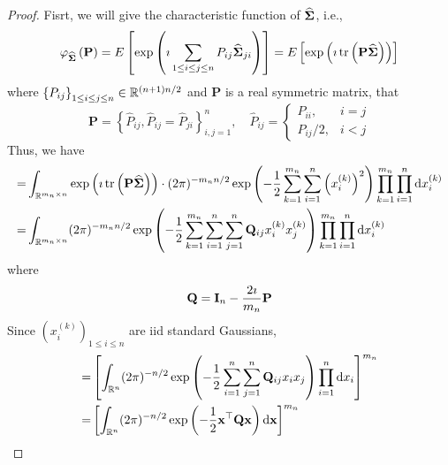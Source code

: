 \begin{proof}
	Fisrt, we will give the characteristic function of \(\widehat{\boldsymbol{\Sigma}}\), i.e.,
	\begin{equation*}
		\varphi_{\widehat{\boldsymbol{\Sigma}}}\left(\mathbf{P}\right)=E\left[\exp\left(\imath\sum_{1\leq i\leq j\leq n}P_{ij}\widehat{\boldsymbol{\Sigma}}_{ji}\right)\right]=E\left[\exp\left(\imath\operatorname{tr}\left(\mathbf{P}\widehat{\boldsymbol{\Sigma}}\right)\right)\right]
	\end{equation*}
	where \(\left\{P_{ij}\right\}_{1\leq i\leq j\leq n}\in\mathbb{R}^{(n+1)n/2}\) and \(\mathbf{P}\) is a real symmetric matrix, that
	\begin{equation*}
		\mathbf{P}=\left\{\widehat{P}_{ij},\widehat{P}_{ij}=\widehat{P}_{ji}\right\}_{i,j=1}^{n},\quad\widehat{P}_{ij}=\begin{cases}P_{ii}, & i=j \\ P_{ij} / 2, & i<j \end{cases}
	\end{equation*}
	Thus, we have
	\begin{equation*}
		\begin{aligned}
			= & \int_{\mathbb{R}^{m_{n}\times n}}\exp\left(\imath\operatorname{tr}\left(\mathbf{P}\widehat{\boldsymbol{\Sigma}}\right)\right)\cdot(2\pi)^{-m_{n}n/2}\exp\left(-\frac{1}{2}\sum_{k=1}^{m_{n}}\sum_{i=1}^{n}\left(x_{i}^{(k)}\right)^{2}\right)\prod_{k=1}^{m_{n}}\prod_{i=1}^{n}\mathop{}\!\mathrm{d} x_{i}^{(k)} \\
			= & \int_{\mathbb{R}^{m_{n}\times n}}(2\pi)^{-m_{n}n/2}\exp\left(-\frac{1}{2}\sum_{k=1}^{m_{n}}\sum_{i=1}^{n}\sum_{j=1}^{n}\mathbf{Q}_{ij}x_{i}^{(k)}x_{j}^{(k)}\right)\prod_{k=1}^{m_{n}}\prod_{i=1}^{n}\mathop{}\!\mathrm{d} x_{i}^{(k)}
		\end{aligned}
	\end{equation*}
	where
	\begin{equation*}
		\mathbf{Q}=\mathbf{I}_{n}-\frac{2\imath}{m_{n}}\mathbf{P}
	\end{equation*}
	Since \(\left(x_{i}^{(k)}\right)_{1\leq i\leq n}\) are iid standard Gaussians,
	\begin{equation*}
		\begin{aligned}
			= & \left[\int_{\bbR^{n}}(2\pi)^{-n/2}\exp\left(-\frac{1}{2}\sum_{i=1}^{n}\sum_{j=1}^{n}\bfQ_{ij}x_{i}x_{j}\right)\prod_{i=1}^{n}\dif x_{i}\right]^{m_{n}}                                                                      \\
			= & \left[\int_{\bbR^{n}}(2\pi)^{-n/2}\exp\left(-\frac{1}{2}\bfx^{\top}\bfQ\bfx\right)\dif\bfx\right]^{m_{n}}                                                                                                                   \\

\end{aligned}
\end{equation*}
\end{proof}
